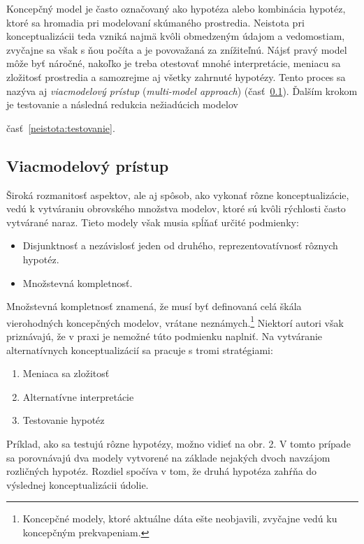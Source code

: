 \documentclass[10pt,twoside,slovak, a4paper]{article}
\begin{document}
Koncepčný model je často označovaný ako hypotéza alebo kombinácia hypotéz, ktoré sa hromadia pri modelovaní skúmaného prostredia. Neistota pri konceptualizácii teda vzniká najmä kvôli obmedzeným údajom a vedomostiam, zvyčajne sa však s ňou počíta a je povovažaná za znížiteľnú. Nájsť pravý model môže byť náročné, nakoľko je treba otestovať mnohé interpretácie, meniacu sa zložitosť prostredia a samozrejme aj všetky zahrnuté hypotézy. Tento proces sa nazýva aj \emph{viacmodelový prístup} (\emph{multi-model approach}) (časť~\ref{neistota:viacmodelovy}). Ďalším krokom je testovanie a následná redukcia nežiadúcich modelov {časť~\ref{neistota:testovanie}.\cite{Enemark:HCMBaT}

\subsection{Viacmodelový prístup} \label{neistota:viacmodelovy}

Široká rozmanitosť aspektov, ale aj spôsob, ako vykonať rôzne konceptualizácie, vedú k vytváraniu obrovského množstva modelov, ktoré sú kvôli rýchlosti často vytvárané naraz.\cite{Enemark:HCMBaT} Tieto modely však musia spĺňať určité podmienky:

\begin{itemize}
\item Disjunktnosť a nezávislosť jeden od druhého, reprezentovatívnosť rôznych hypotéz.
\item Množstevná kompletnosť.\cite{Enemark:HCMBaT}
\end{itemize}

Množstevná kompletnosť znamená, že musí byť definovaná celá škála vierohodných koncepčných modelov, vrátane neznámych.\footnote{Koncepčné modely, ktoré aktuálne dáta ešte neobjavili, zvyčajne vedú ku koncepčným prekvapeniam.} Niektorí autori však priznávajú, že v praxi je nemožné túto podmienku naplniť.\cite{Enemark:HCMBaT} Na vytváranie alternatívnych konceptualizácií sa pracuje s tromi stratégiami:

\begin{enumerate}
\item Meniaca sa zložitosť
\item Alternatívne interpretácie
\item Testovanie hypotéz\cite{Enemark:HCMBaT}
\end{enumerate}

Príklad, ako sa testujú rôzne hypotézy, možno vidieť na obr. 2. V tomto prípade sa porovnávajú dva modely vytvorené na základe nejakých dvoch navzájom rozličných hypotéz. Rozdiel spočíva v tom, že druhá hypotéza zahŕňa do výslednej konceptualizácii údolie.

}
\end{document}

